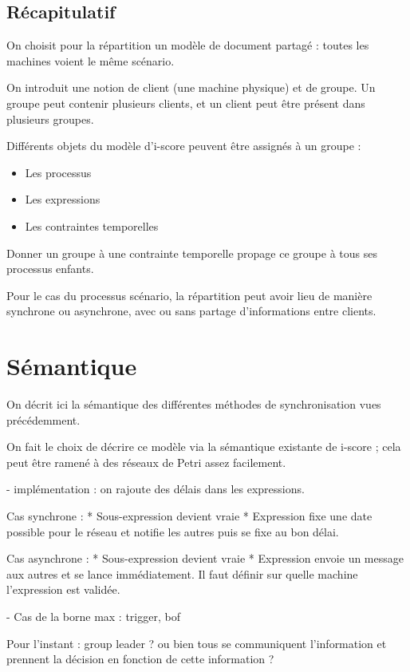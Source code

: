 \documentclass{article}
\begin{document}
\subsection{Récapitulatif}
On choisit pour la répartition un modèle de document partagé : toutes les machines voient le même scénario.

On introduit une notion de client (une machine physique) et de groupe.
Un groupe peut contenir plusieurs clients, et un client peut être présent dans plusieurs groupes.

Différents objets du modèle d'i-score peuvent être assignés à un groupe : 

\begin{itemize}
	\item Les processus
	\item Les expressions
	\item Les contraintes temporelles
\end{itemize}

Donner un groupe à une contrainte temporelle propage ce groupe à tous ses processus enfants.

Pour le cas du processus scénario, la répartition peut avoir lieu de manière synchrone ou asynchrone, 
avec ou sans partage d'informations entre clients.


\section{Sémantique}\label{sec.semantique}
On décrit ici la sémantique des différentes méthodes de synchronisation vues précédemment.

On fait le choix de décrire ce modèle via la sémantique existante de i-score ; cela peut être ramené à des réseaux de Petri assez facilement.



- implémentation : on rajoute des délais dans les expressions.

Cas synchrone : 
* Sous-expression devient vraie
* Expression fixe une date possible pour le réseau et notifie les autres puis se fixe au bon délai.

Cas asynchrone : 
* Sous-expression devient vraie
* Expression envoie un message aux autres et se lance immédiatement.
Il faut définir sur quelle machine l'expression est validée.

- Cas de la borne max : trigger, bof

Pour l'instant : group leader ? ou bien tous se communiquent l'information et prennent la décision en fonction de cette information ?
\end{document}
